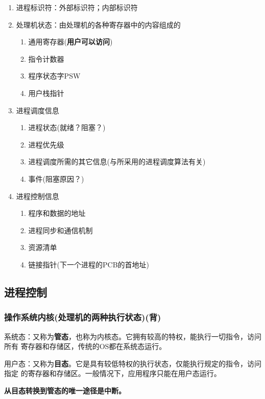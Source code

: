 \documentclass{article}
\begin{document}
\begin{enumerate}
    \item \label{进程标识符}进程标识符：外部标识符；内部标识符
    \item \label{处理机状态}处理机状态：由处理机的各种寄存器中的内容组成的
    \begin{enumerate}
        \item 通用寄存器(\textbf{用户可以访问})
        \item 指令计数器
        \item 程序状态字PSW
        \item 用户栈指针
    \end{enumerate}
    \item \label{进程调度信息}进程调度信息
    \begin{enumerate}
        \item 进程状态(就绪？阻塞？)
        \item 进程优先级
        \item 进程调度所需的其它信息(与所采用的进程调度算法有关)
        \item 事件(阻塞原因？)
    \end{enumerate}
    \item \label{进程控制信息}进程控制信息
    \begin{enumerate}
        \item 程序和数据的地址
        \item 进程同步和通信机制
        \item 资源清单
        \item 链接指针(下一个进程的PCB的首地址)
    \end{enumerate}
\end{enumerate}

\subsection{进程控制}
\subsubsection{{\color{red}操作系统内核(处理机的两种执行状态)}{\color{green}(背)}}
系统态：又称为\textbf{管态}，也称为内核态。它拥有较高的特权，能执行一切指令，访问所有
寄存器和存储区，传统的OS都在系统态运行。

用户态：又称为\textbf{目态}。它是具有较低特权的执行状态，仅能执行规定的指令，访问指定
的寄存器和存储区。一般情况下，应用程序只能在用户态运行。

{\textbf {\color{red}从目态转换到管态的唯一途径是中断。}}
\end{document}

